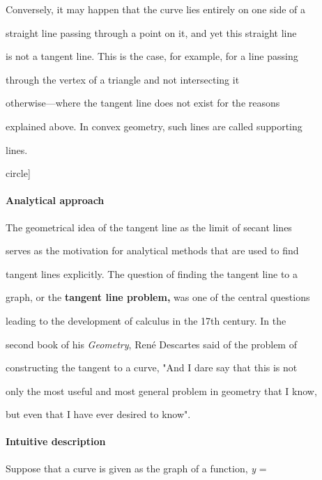 Conversely, it may happen that the curve lies entirely on one side of a

straight line passing through a point on it, and yet this straight line

is not a tangent line. This is the case, for example, for a line passing

through the vertex of a triangle and not intersecting it

otherwise---where the tangent line does not exist for the reasons

explained above. In convex geometry, such lines are called supporting

lines. 




circle]



\paragraph{Analytical approach}



The geometrical idea of the tangent line as the limit of secant lines

serves as the motivation for analytical methods that are used to find

tangent lines explicitly. The question of finding the tangent line to a

graph, or the \textbf{tangent line problem,} was one of the central questions

leading to the development of calculus in the 17th century. In the

second book of his \textit{Geometry}, René Descartes said of the problem of

constructing the tangent to a curve, "And I dare say that this is not

only the most useful and most general problem in geometry that I know,

but even that I have ever desired to know".



\paragraph{Intuitive description}



Suppose that a curve is given as the graph of a function, \textit{y} =

